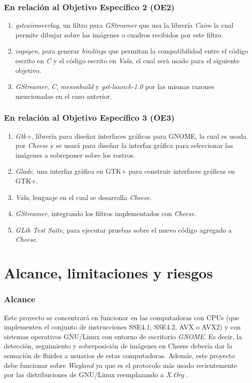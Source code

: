 \documentclass[a4paper,openright,12pt]{report}
\begin{document}
\subsubsection{En relación al Objetivo Específico 2 (OE2)}
\begin{enumerate}
    \item \textit{gstcairooverlay}, un filtro para \textit{GStreamer} que usa
        la librería \textit{Cairo} la cual permite dibujar sobre las imágenes o
        cuadros recibidos por este filtro.
    \item \textit{vapigen}, para generar \textit{bindings} que permitan la
        compatibilidad entre el código escrito en \textit{C} y el código escrito
        en \textit{Vala}, el cual será usado para el siguiente objetivo.
    \item \textit{GStreamer}, \textit{C}, \textit{mesonbuild} y
        \textit{gst-launch-1.0} por las mismas razones mencionadas en el caso
        anterior.
\end{enumerate}

\subsubsection{En relación al Objetivo Específico 3 (OE3)}
\begin{enumerate}
    \item \textit{Gtk+}, librería para diseñar interfaces gráficas para GNOME,
        la cual es usada por \textit{Cheese} y se usará para diseñar la
        interfaz gráfica para seleccionar las imágenes a sobreponer sobre
        los rostros.
    \item \textit{Glade}, una interfaz gráfica en GTK+ para construir interfaces
        gráficas en GTK+.
    \item \textit{Vala}, lenguaje en el cual se desarrolla \textit{Cheese}.
    \item \textit{GStreamer}, integrando los filtros implementados con
        \textit{Cheese}.
    \item \textit{GLib Test Suite}, para ejecutar pruebas sobre el nuevo código
        agregado a \textit{Cheese}.
\end{enumerate}

\section{Alcance, limitaciones y riesgos}

\subsubsection{Alcance}
    Este proyecto se concentrará en funcionar en las computadoras con CPUs (que
    implementen el conjunto de instrucciones SSE4.1, SSE4.2, AVX o AVX2) y
    con sistemas operativos GNU/Linux con entorno de escritorio \textit{GNOME}.
    Es decir, la detección, seguimiento y
    sobreposición de imágenes en Cheese debería dar la sensación de fluidez a
    usuarios de estas computadoras. Además, este proyecto debe funcionar sobre
    \textit{Wayland} ya que es el protocolo más usado recientemente por las
    distribuciones de GNU/Linux reemplazando a \textit{X.Org}
    \cite{LinuxMagazineWaylandStrong}.
\end{document}
